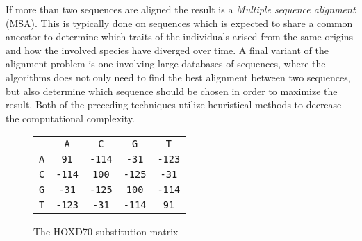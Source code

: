 \documentclass[thesis.tex]{subfiles}
\begin{document}
\par\noindent
If more than two sequences are aligned the result is a \textit{Multiple sequence alignment} (MSA). This is typically done on sequences which is expected to share a common ancestor to determine which traits of the individuals arised from the same origins and how the involved species have diverged over time. A final variant of the alignment problem is one involving large databases of sequences, where the algorithms does not only need to find the best alignment between two sequences, but also determine which sequence should be chosen in order to maximize the result. Both of the preceding techniques utilize heuristical methods to decrease the computational complexity.
\begin{wrapfigure}{R}{0.80\linewidth}
  \begin{mdframed}
    \begin{center}
      \begin{tabularx}{\linewidth}{ccccc}
        &\texttt{A}&\texttt{C}&\texttt{G}&\texttt{T}\\ \cline{2-5}
        \texttt{A}&\multicolumn{1}{|c|}{\texttt{91}}&\texttt{-114}&\multicolumn{1}{|c|}{\texttt{-31}}&\multicolumn{1}{c|}{\texttt{-123}}\\ \cline{2-5}
        \texttt{C}&\multicolumn{1}{|c|}{\texttt{-114}}&\texttt{100}&\multicolumn{1}{|c|}{\texttt{-125}}&\multicolumn{1}{c|}{\texttt{-31}}\\ \cline{2-5}
        \texttt{G}&\multicolumn{1}{|c|}{\texttt{-31}}&\texttt{-125}&\multicolumn{1}{|c|}{\texttt{100}}&\multicolumn{1}{c|}{\texttt{-114}}\\ \cline{2-5}
        \texttt{T}&\multicolumn{1}{|c|}{\texttt{-123}}&\texttt{-31}&\multicolumn{1}{|c|}{\texttt{-114}}&\multicolumn{1}{c|}{\texttt{91}}\\ \cline{2-5}
      \end{tabularx}
    \end{center}
  \end{mdframed}
  \caption{The HOXD70 substitution matrix}
  \label{fig:substitution_matrix}
\end{wrapfigure}
\end{document}
